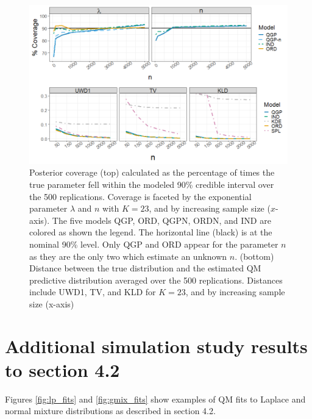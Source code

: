 \documentclass[preprint,12pt,authoryear]{elsarticle}
\begin{document}
\begin{figure}[hbt!]
  \includegraphics[width=\linewidth]{Images/exp_cov_dists.png}

\caption{ Posterior coverage (top) calculated as the percentage of times the 
true parameter fell within the
modeled 90\% credible interval over the 500 replications. Coverage is faceted 
by the exponential parameter $\lambda$
and $n$ with $K = 23$, and by increasing sample size ($x$-axis). 
The five models 
QGP, ORD, QGPN, ORDN,
and IND are colored as shown the legend. The horizontal line (black) is at 
the nominal 90\% level. Only QGP
and ORD appear for the parameter $n$ as they are the only two which estimate 
an unknown $n$. (bottom)
Distance between the true distribution and the estimated QM predictive 
distribution averaged over the 500
replications. Distances include UWD1, TV, and KLD for $K = 23$, 
and by increasing sample size (x-axis)}
\label{fig:exp_cov_dists}
\end{figure}




\section*{Additional simulation study results to section 4.2}

Figures \ref{fig:lp_fits} and \ref{fig:gmix_fits} show examples of QM fits
to Laplace and normal mixture distributions as described in section 4.2.
\end{document}
